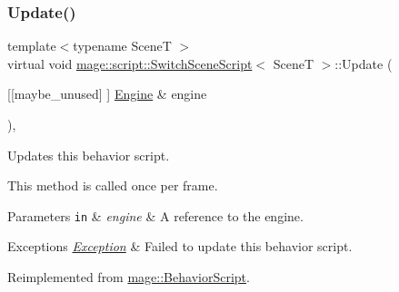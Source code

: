 \subsubsection{\texorpdfstring{Update()}{Update()}}
{\footnotesize\ttfamily template$<$typename SceneT $>$ \\
virtual void \mbox{\hyperlink{classmage_1_1script_1_1_switch_scene_script}{mage\+::script\+::\+Switch\+Scene\+Script}}$<$ SceneT $>$\+::Update (\begin{DoxyParamCaption}\item[{\mbox{[}\mbox{[}maybe\+\_\+unused\mbox{]} \mbox{]} \mbox{\hyperlink{classmage_1_1_engine}{Engine}} \&}]{engine }\end{DoxyParamCaption})\hspace{0.3cm}{\ttfamily [override]}, {\ttfamily [virtual]}}

Updates this behavior script.

This method is called once per frame.


\begin{DoxyParams}[1]{Parameters}
\mbox{\tt in}  & {\em engine} & A reference to the engine. \\
\hline
\end{DoxyParams}

\begin{DoxyExceptions}{Exceptions}
{\em \mbox{\hyperlink{classmage_1_1_exception}{Exception}}} & Failed to update this behavior script. \\
\hline
\end{DoxyExceptions}


Reimplemented from \mbox{\hyperlink{classmage_1_1_behavior_script_a085634661326b59850c1111e537baa4e}{mage\+::\+Behavior\+Script}}.

